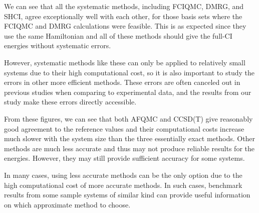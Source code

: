 %

We can see that all the systematic methods, including FCIQMC, DMRG, and SHCI, agree exceptionally well with each other, for those basis sets where the FCIQMC and DMRG calculations were feasible.
This is as expected since they use the same Hamiltonian and all of these methods should give the full-CI energies without systematic errors.

However, systematic methods like these can only be applied to relatively small systems due to their high computational cost, so it is also important to study the errors in other more efficient methods.
These errors are often canceled out in previous studies when comparing to experimental data, and the results from our study make these errors directly accessible.

From these figures, we can see that both AFQMC and CCSD(T) give reasonably good agreement to the reference values and their computational costs increase much slower with the system size than the three essentially exact methods.
Other methods are much less accurate and thus may not produce reliable results for the energies.
However, they may still provide sufficient accuracy for some systems.

In many cases, using less accurate methods can be the only option due to the high computational cost of more accurate methods.
In such cases, benchmark results from some sample systems of similar kind can provide useful information on which approximate method to choose.
